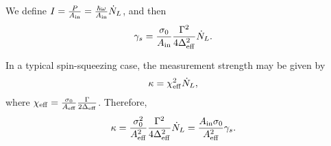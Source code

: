 We define $ I=\frac{P}{A_{\rm in}}= \frac{\hbar \omega }{A_{\rm in}} \dot{N}_L $, and then
\begin{align}
\gamma_s &= \frac{\sigma_0 }{A_{\rm in}} \frac{\Gamma^2}{4\Delta_{\rm eff}^2}\dot{N}_L.
\end{align}

In a typical spin-squeezing case, the measurement strength may be given by
\begin{align}
\kappa &= \chi_{\rm eff}^2 \dot{N}_L,
\end{align} 
where $ \chi_{\rm eff}= \frac{\sigma_0}{A_{\rm eff}} \frac{\Gamma}{2\Delta_{\rm eff}} $.
Therefore,
\begin{align}
\kappa &= \frac{\sigma_0^2}{A_{\rm eff}^2} \frac{\Gamma^2}{4 \Delta_{\rm eff}^2} \dot{N}_L 
= \frac{A_{\rm in}\sigma_0}{ A_{\rm eff}^2}\gamma_s.
\end{align}


%


